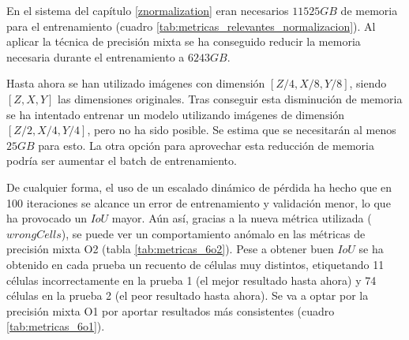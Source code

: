 En el sistema del capítulo \ref{znormalization} eran necesarios $11525GB$ de memoria para el entrenamiento (cuadro \ref{tab:metricas_relevantes_normalizacion}). Al aplicar la técnica de precisión mixta se ha conseguido reducir la memoria necesaria durante el entrenamiento a $6243GB$.

Hasta ahora se han utilizado imágenes con dimensión $[Z/4, X/8, Y/8]$, siendo $[Z, X, Y]$ las dimensiones originales. Tras conseguir esta disminución de memoria se ha intentado entrenar un modelo utilizando imágenes de dimensión $[Z/2, X/4, Y/4]$, pero no ha sido posible. Se estima que se necesitarán al menos $25GB$ para esto. La otra opción para aprovechar esta reducción de memoria podría ser aumentar el batch de entrenamiento.

De cualquier forma, el uso de un escalado dinámico de pérdida ha hecho que en 100 iteraciones se alcance un error de entrenamiento y validación menor, lo que ha provocado un $IoU$ mayor. Aún así, gracias a la nueva métrica utilizada ($wrongCells$), se puede ver un comportamiento anómalo en las métricas de precisión mixta O2 (tabla \ref{tab:metricas_6o2}). Pese a obtener buen $IoU$ se ha obtenido en cada prueba un recuento de células muy distintos, etiquetando 11 células incorrectamente en la prueba 1 (el mejor resultado hasta ahora) y 74 células en la prueba 2 (el peor resultado hasta ahora). Se va a optar por la precisión mixta O1 por aportar resultados más consistentes (cuadro \ref{tab:metricas_6o1}).